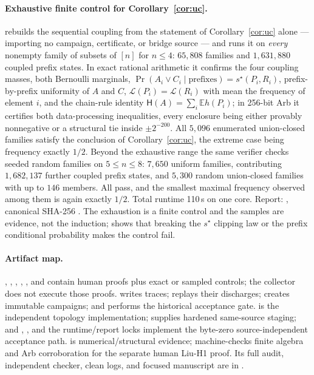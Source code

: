 \documentclass[11pt]{article}
\theoremstyle{plain}
\theoremstyle{definition}
\theoremstyle{remark}
\newcommand{\EE}{\mathbb E}
\newcommand{\sstar}{s^{\star}}
\begin{document}
\paragraph{Exhaustive finite control for Corollary~\ref{cor:uc}.}
 rebuilds the sequential
coupling from the statement of Corollary~\ref{cor:uc} alone --- importing no
campaign, certificate, or bridge source --- and runs it on \emph{every}
nonempty family of subsets of \([n]\) for \(n\le4\): \(65{,}808\) families and
\(1{,}631{,}880\) coupled prefix states.  In exact rational arithmetic it
confirms the four coupling masses, both Bernoulli marginals,
\(\Pr(A_i\vee C_i\mid\text{prefixes})=\sstar(P_i,R_i)\), prefix-by-prefix
uniformity of
\(A\) and \(C\), \(\mathcal L(P_i)=\mathcal L(R_i)\) with mean the frequency of
element \(i\), and the chain-rule identity \(\mathsf H(A)=\sum_i\EE h(P_i)\);
in 256-bit Arb it certifies both data-processing inequalities, every enclosure
being either provably nonnegative or a structural tie inside \(\pm2^{-200}\).
All \(5{,}096\) enumerated union-closed families satisfy the conclusion of
Corollary~\ref{cor:uc}, the extreme case being frequency exactly \(1/2\).
Beyond the exhaustive range the same verifier checks seeded random families on
\(5\le n\le8\): \(7{,}650\) uniform families, contributing \(1{,}682{,}137\)
further coupled prefix states, and \(5{,}300\) random union-closed families
with up to \(146\) members.  All pass, and the smallest maximal frequency
observed among them is again exactly \(1/2\).  Total runtime 110\,s on one
core.  Report:
, canonical SHA-256
.
The exhaustion is a finite
control and the samples are evidence, not the induction;
shows that breaking the \(\sstar\) clipping law or the prefix conditional
probability makes the control fail.

\paragraph{Artifact map.}
, , ,
, , and
 contain human proofs plus exact or sampled controls;
the collector does not execute those proofs.
 writes traces;  replays their discharges;
 creates immutable campaigns; and
 performs the historical acceptance gate.
 is the independent topology
implementation;  supplies hardened
same-source staging; and
,
, and the runtime/report
locks implement the byte-zero source-independent acceptance path.
 is numerical/structural evidence;
 machine-checks finite algebra and Arb corroboration
for the separate human Liu-H1 proof.  Its full audit, independent checker,
clean logs, and focused manuscript are in .
\end{document}
